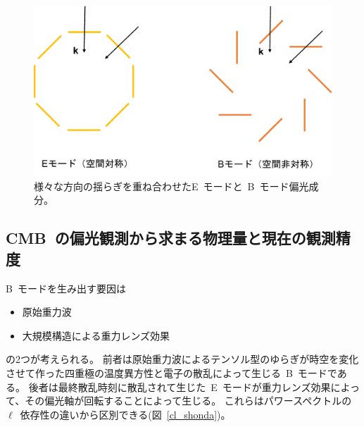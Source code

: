 \begin{figure}[htbp]
  \centering
  \includegraphics[width=0.8\columnwidth]{2_cosmology/figs/ebmode2.pdf}
  \caption{様々な方向の揺らぎを重ね合わせたE~モードと~B~モード偏光成分。}
  \label{ebmode2}
\end{figure}

\subsection{CMB~の偏光観測から求まる物理量と現在の観測精度}

B~モードを生み出す要因は
\begin{itemize}
  \item 原始重力波
  \item 大規模構造による重力レンズ効果
\end{itemize}
の2つが考えられる。
前者は原始重力波によるテンソル型のゆらぎが時空を変化させて作った四重極の温度異方性と電子の散乱によって生じる~B~モードである。
後者は最終散乱時刻に散乱されて生じた~E~モードが重力レンズ効果によって、その偏光軸が回転することによって生じる。
これらはパワースペクトルの~$\ell$~依存性の違いから区別できる(図~\ref{cl_shonda})。

